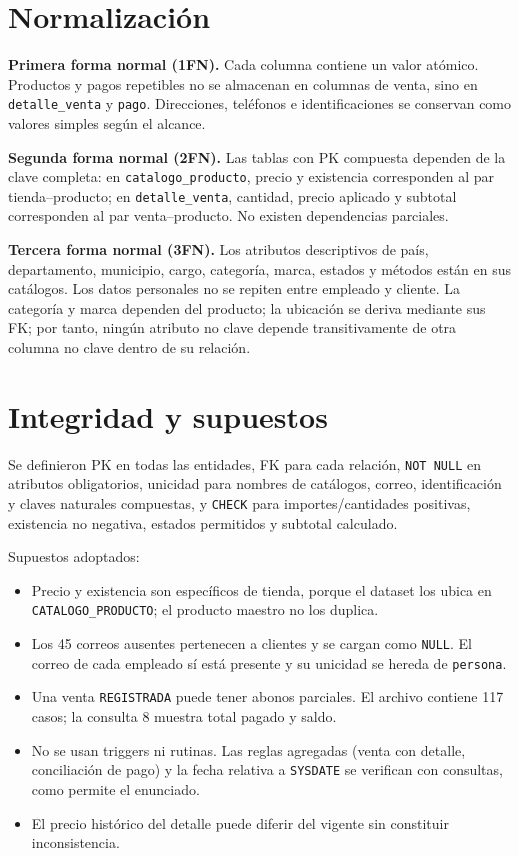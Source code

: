 \documentclass[10pt,letterpaper]{article}
\begin{document}
\section{Normalización}
\textbf{Primera forma normal (1FN).} Cada columna contiene un valor atómico. Productos y pagos repetibles no se almacenan en columnas de venta, sino en \texttt{detalle\_venta} y \texttt{pago}. Direcciones, teléfonos e identificaciones se conservan como valores simples según el alcance.

\textbf{Segunda forma normal (2FN).} Las tablas con PK compuesta dependen de la clave completa: en \texttt{catalogo\_producto}, precio y existencia corresponden al par tienda--producto; en \texttt{detalle\_venta}, cantidad, precio aplicado y subtotal corresponden al par venta--producto. No existen dependencias parciales.

\textbf{Tercera forma normal (3FN).} Los atributos descriptivos de país, departamento, municipio, cargo, categoría, marca, estados y métodos están en sus catálogos. Los datos personales no se repiten entre empleado y cliente. La categoría y marca dependen del producto; la ubicación se deriva mediante sus FK; por tanto, ningún atributo no clave depende transitivamente de otra columna no clave dentro de su relación.

\section{Integridad y supuestos}
Se definieron PK en todas las entidades, FK para cada relación, \texttt{NOT NULL} en atributos obligatorios, unicidad para nombres de catálogos, correo, identificación y claves naturales compuestas, y \texttt{CHECK} para importes/cantidades positivas, existencia no negativa, estados permitidos y subtotal calculado.

Supuestos adoptados:
\begin{itemize}
\item Precio y existencia son específicos de tienda, porque el dataset los ubica en \texttt{CATALOGO\_PRODUCTO}; el producto maestro no los duplica.
\item Los 45 correos ausentes pertenecen a clientes y se cargan como \texttt{NULL}. El correo de cada empleado sí está presente y su unicidad se hereda de \texttt{persona}.
\item Una venta \texttt{REGISTRADA} puede tener abonos parciales. El archivo contiene 117 casos; la consulta 8 muestra total pagado y saldo.
\item No se usan triggers ni rutinas. Las reglas agregadas (venta con detalle, conciliación de pago) y la fecha relativa a \texttt{SYSDATE} se verifican con consultas, como permite el enunciado.
\item El precio histórico del detalle puede diferir del vigente sin constituir inconsistencia.
\end{itemize}
\end{document}
